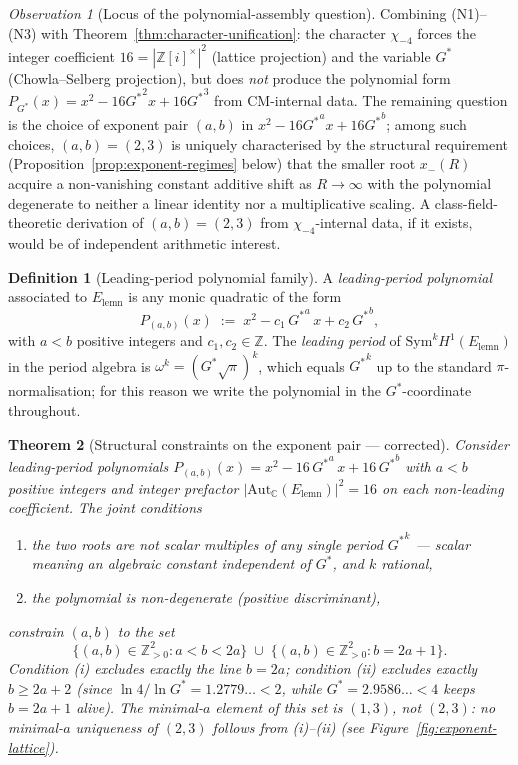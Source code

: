 \documentclass[11pt]{article}
\newtheorem{theorem}{Theorem}[section]
\theoremstyle{definition}
\newtheorem{definition}[theorem]{Definition}
\theoremstyle{remark}
\newtheorem*{observation}{Observation}
\newcommand{\Gs}{G^{*}}
\newcommand{\Gss}{{G^{*}}^{2}}
\newcommand{\Gsss}{{G^{*}}^{3}}
\newcommand{\Z}{\mathbb{Z}}
\newcommand{\C}{\mathbb{C}}
\newcommand{\Aut}{\mathrm{Aut}}
\begin{document}
\begin{observation}[Locus of the polynomial-assembly question]\label{obs:gap-localised}
Combining (N1)--(N3) with Theorem~\ref{thm:character-unification}: the
character $\chi_{-4}$ forces the integer coefficient
$16 = |\Z[i]^{\times}|^{2}$ (lattice projection) and the variable $\Gs$
(Chowla--Selberg projection), but does \emph{not} produce the polynomial
form $P_{\Gs}(x) = x^{2} - 16\Gss x + 16\Gsss$ from CM-internal data.
The remaining question is the choice of exponent pair $(a, b)$ in
$x^{2} - 16{\Gs}^{a} x + 16{\Gs}^{b}$; among such choices, $(a, b) = (2, 3)$
is uniquely characterised by the structural requirement
(Proposition~\ref{prop:exponent-regimes} below) that the smaller root
$x_{-}(R)$ acquire a non-vanishing constant additive shift as
$R \to \infty$ with the polynomial degenerate to neither a linear identity
nor a multiplicative scaling. A class-field-theoretic derivation of
$(a, b) = (2, 3)$ from $\chi_{-4}$-internal data, if it exists, would be
of independent arithmetic interest.
\end{observation}

\begin{definition}[Leading-period polynomial family]\label{def:leading-period-poly}
A \emph{leading-period polynomial} associated to $E_{\mathrm{lemn}}$ is
any monic quadratic of the form
\[
P_{(a, b)}(x) \;:=\; x^{2} - c_{1}\,{\Gs}^{a}\,x + c_{2}\,{\Gs}^{b},
\]
with $a < b$ positive integers and $c_{1}, c_{2} \in \Z$. The
\emph{leading period} of $\mathrm{Sym}^{k} H^{1}(E_{\mathrm{lemn}})$ in the
period algebra is $\omega^{k} = (\Gs\sqrt\pi)^{k}$, which equals
${\Gs}^{k}$ up to the standard $\pi$-normalisation; for this reason we
write the polynomial in the $\Gs$-coordinate throughout.
\end{definition}

\begin{theorem}[Structural constraints on the exponent pair --- corrected]\label{thm:sym-23-uniqueness}
Consider leading-period polynomials
$P_{(a, b)}(x) = x^{2} - 16\,{\Gs}^{a}\,x + 16\,{\Gs}^{b}$
with $a < b$ positive integers and integer prefactor
$|\Aut_\C(E_{\mathrm{lemn}})|^{2} = 16$ on each non-leading coefficient.
The joint conditions
\begin{enumerate}[label=\textup{(\roman*)}, leftmargin=*, itemsep=2pt]
\item the two roots are not scalar multiples of any single period
${\Gs}^{k}$ --- scalar meaning an algebraic constant independent of
$\Gs$, and $k$ rational,
\item the polynomial is non-degenerate (positive discriminant),
\end{enumerate}
constrain $(a, b)$ to the set
\[
\{(a, b) \in \Z_{>0}^{2} : a < b < 2a\} \;\cup\;
\{(a, b) \in \Z_{>0}^{2} : b = 2a + 1\}.
\]
Condition \textup{(i)} excludes exactly the line $b = 2a$; condition
\textup{(ii)} excludes exactly $b \geq 2a + 2$ (since
$\ln 4/\ln\Gs = 1.2779\ldots < 2$, while $\Gs = 2.9586\ldots < 4$
keeps $b = 2a + 1$ alive). The minimal-$a$ element of this set is
$(1, 3)$, \emph{not} $(2, 3)$: no minimal-$a$ uniqueness of $(2, 3)$
follows from \textup{(i)}--\textup{(ii)}
(see Figure~\ref{fig:exponent-lattice}).
\end{theorem}
\end{document}
